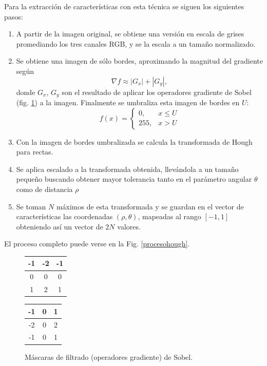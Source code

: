 \documentclass[conference,spanish,a4paper,10pt,oneside,final]{tfmpd}
\begin{document}
Para la extracción de características con esta técnica se siguen los siguientes
pasos:
\begin{enumerate}
\item A partir de la imagen original, se obtiene una versión en escala de grises
      promediando los tres canales RGB, y se la escala a un tamaño normalizado.
\item Se obtiene una imagen de sólo bordes, aproximando la magnitud del
      gradiente según
      \begin{equation}
      \label{sob}
      \nabla f \approx |G_x| + |G_y|,
      \end{equation}
      donde $G_x$, $G_y$ son el resultado de aplicar los operadores gradiente
      de Sobel (fig. \ref{masksobel}) a la imagen. 
      Finalmente se umbraliza esta imagen de bordes en $U$:
      \begin{equation}
      \label{umbral}
      f(x)=
      \begin{cases}
      0, & x\leq U\\
      255, & x > U
      \end{cases}
      \end{equation}
\item Con la imagen de bordes umbralizada se calcula la transformada de
      Hough para rectas.
\item Se aplica escalado a la transformada obtenida, llevándola a un tamaño
      pequeño buscando obtener mayor tolerancia tanto en el parámetro angular
      $\theta$ como de distancia $\rho$
\item Se toman $N$ máximos de esta transformada y se guardan en el vector de
      características las coordenadas $(\rho,\theta)$, mapeadas al rango
      $[-1,1]$ obteniendo así un vector de $2N$ valores.
\end{enumerate}
El proceso completo puede verse en la Fig. \ref{procesohough}.
\begin{figure}
\begin{center}
\begin{tabular}{|c|c|c|}
\hline -1 & -2 & -1 \\\hline 0 & 0 & 0 \\\hline 1 & 2 & 1 \\\hline
\end{tabular}
\begin{tabular}{|c|c|c|}
\hline -1 & 0 & 1 \\\hline -2 & 0 & 2 \\\hline -1 & 0 & 1 \\\hline
\end{tabular}
\end{center}
\caption{Máscaras de filtrado (operadores gradiente) de Sobel.}
\label{masksobel}
\end{figure}
\end{document}
